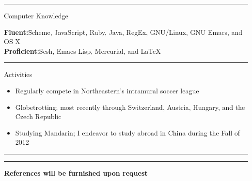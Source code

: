 \documentclass[10pt]{letter}
\begin{document}
\rule{\linewidth}{.5pt}


{\Large Computer Knowledge}
\begin{tabbing}
\textbf{Fluent:}\hspace{.5in}\=Scheme, JavaScript, Ruby, Java, RegEx,
GNU/Linux, GNU Emacs, and OS X\\
\textbf{Proficient:}\>Scsh, Emacs Lisp, Mercurial, and \LaTeX
\end{tabbing}

\rule{\linewidth}{.5pt}

{\Large Activities}
\begin{itemize}
\setlength\itemsep{1pt}
\item{Regularly compete in Northeastern's intramural soccer league}
\item{Globetrotting; most recently through Switzerland, Austria, Hungary, and
  the Czech Republic}
\item{Studying Mandarin; I endeavor to study abroad in China during the Fall of
  2012}
\end{itemize}

\rule{\linewidth}{.5pt}

\vspace{-15pt}

\rule{\linewidth}{.5pt}

\begin{center}\textbf{References will be furnished upon request}\end{center}
\end{document}
